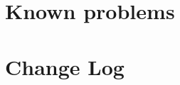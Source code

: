 \begin{appendix}
\begin{comment}
%

\chapter{\textit{Migration of the \appName\ system}}


\chapter{\textit{Backup}}

\end{comment}
\chapter{Known problems}
\label{chap:knownProblems}


\chapter{Change Log}


\end{appendix}
